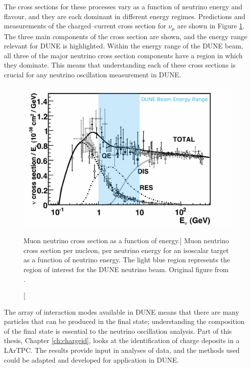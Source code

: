 \bigskip\noindent
The cross sections for these processes vary as a function of neutrino energy and
flavour, and they are each dominant in different energy regimes. Predictions 
and measurements of the charged--current cross section for $\nu_\mu$ are shown 
in Figure \ref{fig:numu_xsec}. The three main components of the cross section 
are shown, and the energy range relevant for DUNE is 
highlighted\cite{Formaggio:2013kya}. Within the energy range of the DUNE 
beam, all three of the major neutrino cross section components have a region 
in which they dominate. This means that understanding each of these cross 
sections is crucial for any neutrino oscillation measurement in DUNE. 

\begin{figure}
	\centering
	\includegraphics[width=\textwidth]{figures/numu_xsec.pdf}
	\caption
	[Muon neutrino cross section as a function of energy.]
	{Muon neutrino cross section per nucleon, per neutrino energy for an isoscalar
	target as a function of neutrino energy. The light blue region represents the 
	region of interest for the DUNE neutrino beam. Original figure from 
	\cite{Formaggio:2013kya}.}
	\label{fig:numu_xsec}
\end{figure}

The array of interaction modes available in DUNE means that there are many
particles that can be produced in the final state; understanding 
the composition of the final state is essential to the neutrino oscillation 
analysis. Part of this thesis, Chapter \ref{ch:chargeid}, looks at
the identification of charge deposits in a LArTPC. The results provide input 
in analyses of \protodune{} data, and the methods used could be adapted and 
developed for application in DUNE. 


